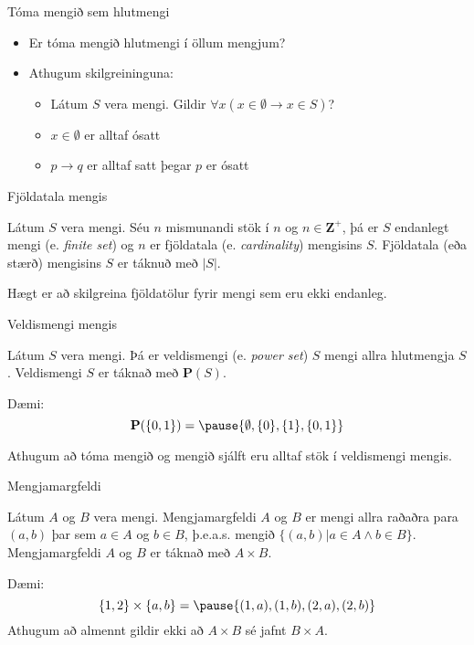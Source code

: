 \documentclass{beamer}
\begin{document}
\begin{frame}{Tóma mengið sem hlutmengi}
\begin{itemize}
 \item Er tóma mengið hlutmengi í öllum mengjum? \pause
 \item Athugum skilgreininguna:
 \begin{itemize}
  \item Látum $S$ vera mengi. Gildir $\forall x (x \in \emptyset \to x \in S)$? \pause
  \item $x \in \emptyset$ er alltaf ósatt \pause
  \item $p \to q$ er alltaf satt þegar $p$ er ósatt
 \end{itemize}
\end{itemize}
\end{frame}

\begin{frame}{Fjöldatala mengis}
\begin{tcolorbox}[title=Fjöldatala]
Látum $S$ vera mengi. Séu $n$ mismunandi stök í $n$ og $n \in \mathbf{Z^+}$, þá er $S$ endanlegt mengi (e. \emph{finite set}) og $n$ er fjöldatala (e. \emph{cardinality}) mengisins $S$. Fjöldatala (eða stærð) mengisins $S$ er táknuð með $|S|$.
\end{tcolorbox}
Hægt er að skilgreina fjöldatölur fyrir mengi sem eru ekki endanleg.
\end{frame}

\begin{frame}{Veldismengi mengis}
\begin{tcolorbox}[title=Veldismengi]
Látum $S$ vera mengi. Þá er veldismengi (e. \emph{power set}) $S$ mengi allra hlutmengja $S$. Veldismengi $S$ er táknað með $\mathbf{P}(S)$.
\end{tcolorbox}
Dæmi: \[\mathbf{P}(\{0, 1\}) = \pause \{\emptyset, \{0\}, \{1\}, \{0, 1\}\}\]

Athugum að tóma mengið og mengið sjálft eru alltaf stök í veldismengi mengis.
\end{frame}

\begin{frame}{Mengjamargfeldi}
\begin{tcolorbox}[title=Mengjamargfeldi]
Látum $A$ og $B$ vera mengi. Mengjamargfeldi $A$ og $B$ er mengi allra raðaðra para $(a, b)$ þar sem $a \in A$ og $b \in B$, þ.e.a.s. mengið $\{(a, b) | a \in A \land b \in B\}$. Mengjamargfeldi $A$ og $B$ er táknað með $A \times B$.
\end{tcolorbox}
Dæmi:
\[
 \{1, 2\} \times \{a, b\} = \pause \{(1, a), (1, b), (2, a), (2, b)\}
\]
Athugum að almennt gildir ekki að $A \times B$ sé jafnt $B \times A$.
\end{frame}
\end{document}
